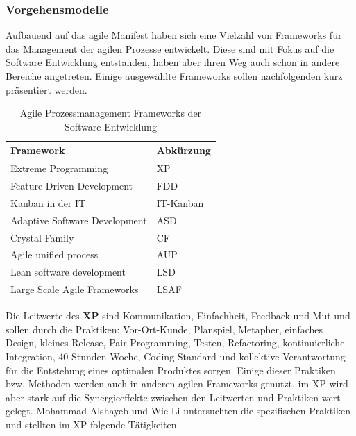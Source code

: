 \subsubsection{Vorgehensmodelle}
Aufbauend auf das agile Manifest haben sich eine Vielzahl von Frameworks für das Management der agilen Prozesse entwickelt. 
Diese sind mit Fokus auf die Software Entwicklung entstanden, haben aber ihren Weg auch schon in andere Bereiche angetreten. 
Einige ausgewählte Frameworks sollen nachfolgenden kurz präsentiert werden. 
\newline
\begin{table}[h!]
    \centering
    \caption{Agile Prozessmanagement Frameworks der Software Entwicklung}
    \label{tab:agile-frameworks}
    \begin{tabular}{|l|l|}
    \hline
    \textbf{Framework}            & \textbf{Abkürzung} \\ \hline
    Extreme Programming           & XP                 \\ \hline
    Feature Driven Development    & FDD                \\ \hline
    Kanban in der IT              & IT-Kanban          \\ \hline
    Adaptive Software Development & ASD                \\ \hline
    Crystal Family                & CF                 \\ \hline
    Agile unified process         & AUP                \\ \hline
    Lean software development     & LSD                \\ \hline
    Large Scale Agile Frameworks  & LSAF               \\ \hline
    \end{tabular}
\end{table} 
\newline
Die Leitwerte des \textbf{XP} sind Kommunikation, Einfachheit, Feedback und Mut und sollen durch die Praktiken:
Vor-Ort-Kunde, Planspiel, Metapher, einfaches Design, kleines Release, Pair Programming, Testen, Refactoring, 
kontinuierliche Integration, 40-Stunden-Woche, Coding Standard und kollektive Verantwortung für die Entstehung 
eines optimalen Produktes sorgen. Einige dieser Praktiken bzw. Methoden werden auch in anderen agilen Frameworks 
genutzt, im XP wird aber stark auf die Synergieeffekte zwischen den Leitwerten und Praktiken wert gelegt. \cite{FOJTIK20111464}
\newline Mohammad Alshayeb und Wie Li untersuchten die spezifischen Praktiken und stellten im XP folgende Tätigkeiten
